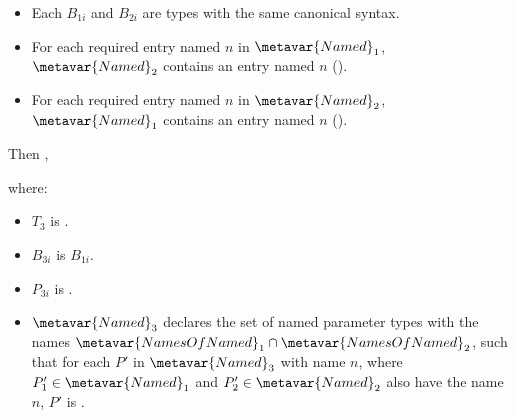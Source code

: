 \documentclass[makeidx]{article}
\begin{document}
{\begin{itemize}
  \begin{itemize}
  \item Each $B_{1i}$ and $B_{2i}$ are types with the same canonical syntax.
  \item For each required entry named $n$ in $\metavar{Named}_1$,
    $\metavar{Named}_2$ contains an entry named $n$
    ().
  \item For each required entry named $n$ in $\metavar{Named}_2$,
    $\metavar{Named}_1$ contains an entry named $n$
    ().
  \end{itemize}

  Then ,

  \noindent
  where:

  \begin{itemize}
  \item $T_3$ is .
  \item $B_{3i}$ is $B_{1i}$.
  \item $P_{3i}$ is .
  \item $\metavar{Named}_3$ declares the set
    of named parameter types with the names
    $\metavar{NamesOfNamed}_1\cap\metavar{NamesOfNamed}_2$,
    such that for each $P'$ in $\metavar{Named}_3$ with name $n$,
    where $P'_1 \in \metavar{Named}_1$
    and $P'_2 \in \metavar{Named}_2$
    also have the name $n$,
    $P'$ is .
  \end{itemize}


\end{itemize}}
\end{document}
